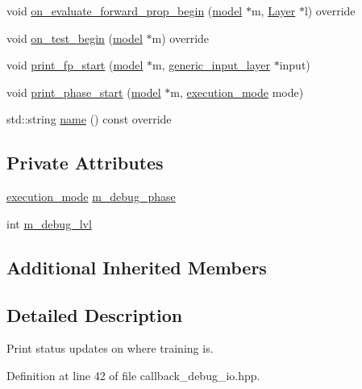 \begin{DoxyCompactItemize}
void \hyperlink{classlbann_1_1lbann__callback__debug__io_ac9b36fc36ab6faa9de44db026addf02a}{on\+\_\+evaluate\+\_\+forward\+\_\+prop\+\_\+begin} (\hyperlink{classlbann_1_1model}{model} $\ast$m, \hyperlink{classlbann_1_1Layer}{Layer} $\ast$l) override
\item 
void \hyperlink{classlbann_1_1lbann__callback__debug__io_a469dfa4eece0a707a2d56f4c67aea9b7}{on\+\_\+test\+\_\+begin} (\hyperlink{classlbann_1_1model}{model} $\ast$m) override
\item 
void \hyperlink{classlbann_1_1lbann__callback__debug__io_a3c9897a583441381f82a11246aea4424}{print\+\_\+fp\+\_\+start} (\hyperlink{classlbann_1_1model}{model} $\ast$m, \hyperlink{classlbann_1_1generic__input__layer}{generic\+\_\+input\+\_\+layer} $\ast$input)
\item 
void \hyperlink{classlbann_1_1lbann__callback__debug__io_a528f4aea5f657f40b27c58a164d4095a}{print\+\_\+phase\+\_\+start} (\hyperlink{classlbann_1_1model}{model} $\ast$m, \hyperlink{base_8hpp_a2781a159088df64ed7d47cc91c4dc0a8}{execution\+\_\+mode} mode)
\item 
std\+::string \hyperlink{classlbann_1_1lbann__callback__debug__io_ae624010712365242688be8e55a566c62}{name} () const override
\end{DoxyCompactItemize}
\subsection*{Private Attributes}
\begin{DoxyCompactItemize}
\item 
\hyperlink{base_8hpp_a2781a159088df64ed7d47cc91c4dc0a8}{execution\+\_\+mode} \hyperlink{classlbann_1_1lbann__callback__debug__io_add73fbc786ca9284fa3399a7e99d0b1f}{m\+\_\+debug\+\_\+phase}
\item 
int \hyperlink{classlbann_1_1lbann__callback__debug__io_adfd537a09e80aaa0887e5226dc52c13c}{m\+\_\+debug\+\_\+lvl}
\end{DoxyCompactItemize}
\subsection*{Additional Inherited Members}


\subsection{Detailed Description}
Print status updates on where training is. 

Definition at line 42 of file callback\+\_\+debug\+\_\+io.\+hpp.



